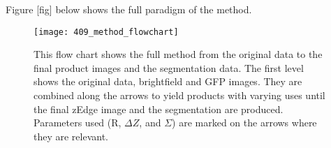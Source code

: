 Figure [fig] below shows the full paradigm of the method.
\begin{figure}[h!]
 \centering
 \texttt{[image: 409\_method\_flowchart]}
 \caption[Method flow chart]{
 	This flow chart shows the full method from the original data to the final product images and the segmentation data. The first level shows the original data, brightfield and GFP images. They are combined along the arrows to yield products with varying uses until the final zEdge image and the segmentation are produced. Parameters used (R, $\Delta Z$, and $\Sigma$) are marked on the arrows where they are relevant.
 }
 \label{fig:flowchart}
\end{figure}
